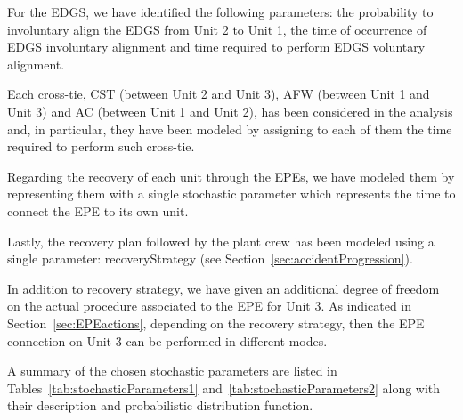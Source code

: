 For the EDGS, we have identified the following parameters: the probability to 
involuntary align the EDGS from Unit 2 to Unit 1, the time of occurrence of EDGS
involuntary alignment and time required to perform EDGS voluntary alignment.  

Each cross-tie, CST (between Unit 2 and Unit 3), AFW (between Unit 1 and Unit 3) 
and AC (between Unit 1 and Unit 2), has been considered in the analysis and, in 
particular, they have been modeled by assigning to each of them the time required 
to perform such cross-tie.

Regarding the recovery of each unit through the EPEs, we have modeled them by 
representing them with a single stochastic parameter which represents the
time to connect the EPE to its own unit.

Lastly, the recovery plan followed by the plant crew has been modeled using a single
parameter: recoveryStrategy (see Section~\ref{sec:accidentProgression}).

In addition to recovery strategy, we have given an additional degree of freedom on 
the actual procedure associated to the EPE for Unit 3. 
As indicated in Section~\ref{sec:EPEactions}, depending on the  recovery strategy, 
then the EPE connection on Unit 3 can be performed in different modes. 

A summary of the chosen stochastic parameters are listed in Tables~\ref{tab:stochasticParameters1} 
and~\ref{tab:stochasticParameters2}
along with their description and probabilistic distribution function.

